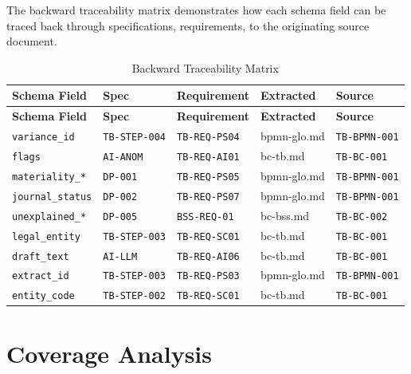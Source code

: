 \documentclass[11pt,a4paper,twoside]{report}
\newcommand{\srcref}[1]{\texttt{#1}}
\newcommand{\reqref}[1]{\texttt{#1}}
\newcommand{\specref}[1]{\texttt{#1}}
\newcommand{\fieldref}[1]{\textcolor{sapblue}{\texttt{#1}}}
\begin{document}
The backward traceability matrix demonstrates how each schema field
can be traced back through specifications, requirements, to the
originating source document.

\begin{longtable}{@{}L{3cm}C{2cm}C{2.5cm}C{2.5cm}C{2.5cm}@{}}
\caption{Backward Traceability Matrix}
\label{tab:backward-traceability} \\
\toprule
\textbf{Schema Field} & \textbf{Spec} & \textbf{Requirement} & \textbf{Extracted} & \textbf{Source} \\
\midrule
\endfirsthead
\toprule
\textbf{Schema Field} & \textbf{Spec} & \textbf{Requirement} & \textbf{Extracted} & \textbf{Source} \\
\midrule
\endhead
\fieldref{variance\_id} & \specref{TB-STEP-004} & \reqref{TB-REQ-PS04} & bpmn-glo.md & \srcref{TB-BPMN-001} \\
\fieldref{flags} & \specref{AI-ANOM} & \reqref{TB-REQ-AI01} & bc-tb.md & \srcref{TB-BC-001} \\
\fieldref{materiality\_*} & \specref{DP-001} & \reqref{TB-REQ-PS05} & bpmn-glo.md & \srcref{TB-BPMN-001} \\
\fieldref{journal\_status} & \specref{DP-002} & \reqref{TB-REQ-PS07} & bpmn-glo.md & \srcref{TB-BPMN-001} \\
\fieldref{unexplained\_*} & \specref{DP-005} & \reqref{BSS-REQ-01} & bc-bss.md & \srcref{TB-BC-002} \\
\fieldref{legal\_entity} & \specref{TB-STEP-003} & \reqref{TB-REQ-SC01} & bc-tb.md & \srcref{TB-BC-001} \\
\fieldref{draft\_text} & \specref{AI-LLM} & \reqref{TB-REQ-AI06} & bc-tb.md & \srcref{TB-BC-001} \\
\fieldref{extract\_id} & \specref{TB-STEP-003} & \reqref{TB-REQ-PS03} & bpmn-glo.md & \srcref{TB-BPMN-001} \\
\fieldref{entity\_code} & \specref{TB-STEP-002} & \reqref{TB-REQ-SC01} & bc-tb.md & \srcref{TB-BC-001} \\
\bottomrule
\end{longtable}

\section{Coverage Analysis}
\label{sec:coverage-analysis}
\end{document}
